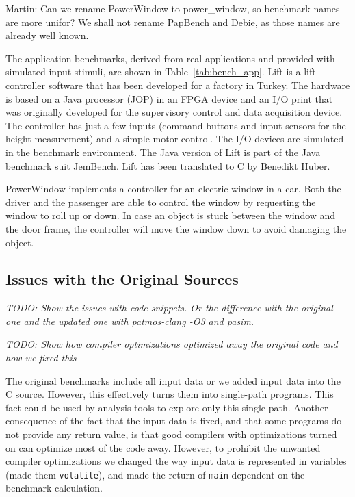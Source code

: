 \documentclass[a4paper,UKenglish]{oasics}
\newcommand{\todo}[1]{{\emph{TODO: #1}}}
\newcommand{\martin}[1]{{\color{blue} Martin: #1}}
\newcommand{\code}[1]{{\small{\texttt{#1}}}}
\begin{document}
\martin{Can we rename PowerWindow to power\_window, so benchmark names are
more unifor? We shall not rename PapBench and Debie, as those names are already
well known.}

The application benchmarks, derived from real applications and provided with simulated input stimuli, are shown in Table~\ref{tab:bench_app}.
%
Lift is a lift controller software that has been developed for a
factory in Turkey. The hardware is based on a Java processor (JOP) in an
FPGA device and an I/O print that was originally developed
for the supervisory control and data acquisition device.
The controller has just a few inputs (command buttons and input
sensors for the height measurement) and a simple motor control.
The I/O devices are simulated in the benchmark environment.
The Java version of Lift is part of the Java benchmark suit JemBench.
Lift has been translated to C by Benedikt Huber.

PowerWindow implements a controller for an electric window in a car.
Both the driver and the passenger are able to control the window by 
requesting the window to roll up or down.
In case an object is stuck between the window and the door frame,
the controller will move the window down to avoid damaging the object.

\subsection{Issues with the Original Sources}


\todo{Show the issues with code snippets. Or the difference with the original one
and the updated one with patmos-clang -O3 and pasim.}

\todo{Show how compiler optimizations optimized away the original code and how we fixed this}

The original benchmarks include all input data or we added input data into the C source.
However, this effectively turns them into single-path programs.
This fact could be used by analysis tools to explore only this single path.
Another consequence of the fact that the
input data is fixed, and that some programs do not provide
any return value, is that good compilers with optimizations turned on can optimize
most of the code away.
However, to prohibit the unwanted compiler optimizations we changed
the way input data is represented in variables (made them \code{volatile}),
and made the return of \code{main} dependent on the benchmark calculation.

\end{document}
